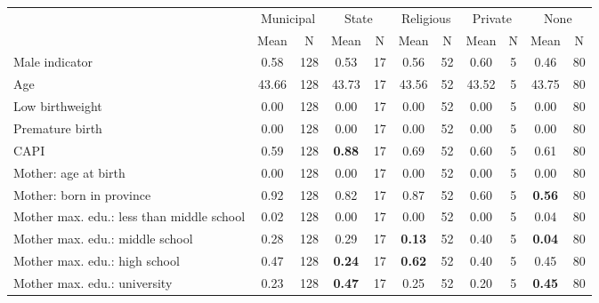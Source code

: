 \begin{tabular}{l c c c c c c c c c c}
\toprule
& \multicolumn{2}{c}{Municipal} & \multicolumn{2}{c}{State} & \multicolumn{2}{c}{Religious} & \multicolumn{2}{c}{Private} & \multicolumn{2}{c}{None} \\
& \scriptsize Mean & \scriptsize N & \scriptsize Mean & \scriptsize N & \scriptsize Mean & \scriptsize N & \scriptsize Mean & \scriptsize N & \scriptsize Mean & \scriptsize N \\
\midrule
Male indicator &      0.58 &       128 &      0.53 &        17 &      0.56 &        52 &      0.60 &         5 &      0.46 &        80 \\
Age &     43.66 &       128 &     43.73 &        17 &     43.56 &        52 &     43.52 &         5 &     43.75 &        80 \\
Low birthweight &      0.00 &       128 &      0.00 &        17 &      0.00 &        52 &      0.00 &         5 &      0.00 &        80 \\
Premature birth &      0.00 &       128 &      0.00 &        17 &      0.00 &        52 &      0.00 &         5 &      0.00 &        80 \\
CAPI &      0.59 &       128 & \textbf{     0.88} &        17 &      0.69 &        52 &      0.60 &         5 &      0.61 &        80 \\
Mother: age at birth &      0.00 &       128 &      0.00 &        17 &      0.00 &        52 &      0.00 &         5 &      0.00 &        80 \\
Mother: born in province &      0.92 &       128 &      0.82 &        17 &      0.87 &        52 &      0.60 &         5 & \textbf{     0.56} &        80 \\
Mother max. edu.: less than middle school &      0.02 &       128 &      0.00 &        17 &      0.00 &        52 &      0.00 &         5 &      0.04 &        80 \\
Mother max. edu.: middle school &      0.28 &       128 &      0.29 &        17 & \textbf{     0.13} &        52 &      0.40 &         5 & \textbf{     0.04} &        80 \\
Mother max. edu.: high school &      0.47 &       128 & \textbf{     0.24} &        17 & \textbf{     0.62} &        52 &      0.40 &         5 &      0.45 &        80 \\
Mother max. edu.: university &      0.23 &       128 & \textbf{     0.47} &        17 &      0.25 &        52 &      0.20 &         5 & \textbf{     0.45} &        80 \\

\end{tabular}
